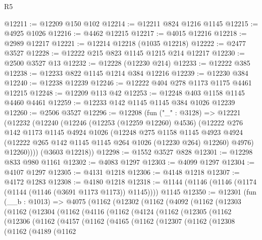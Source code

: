 \begin{lexlean}{R5}
\begin{coremodule}
@12211 := @12209 @150 @102
@12214 := @12211 @824 @1216 @1145
@12215 := @4925 @1026
@12216 := @4462 @12215
@12217 := @4015 @12216
@12218 := @2989 @12217
@12221 := @12214 @12218 (@1035 @12218)
@12222 := @2477 @3527
@12228 := @12222 @215 @823 @1145 @1215 @214 @12217
@12230 := @2500 @3527 @13
@12232 := @12228 (@12230 @214)
@12233 := @12222 @385
@12238 := @12233 @822 @1145 @1214 @384 @12216
@12239 := @12230 @384
@12240 := @12238 @12239
@12246 := @12222 @404 @278 @1173 @1175 @4461 @12215
@12248 := @12209 @113 @42
@12253 := @12248 @403 @1158 @1145 @4460 @4461
@12259 := @12233 @142 @1145 @1145 @384 @1026 @12239
@12260 := @2506 @3527
@12296 := @12208
    (fun ("_" : @3128) =>
    @12221
      (@12232
        (@12240
          (@12246
            (@12253 (@12259 @12260) @4536)
            (@12222
              @276
              @142
              @1173
              @1145
              @4924
              @1026
              (@12248
                @275
                @1158
                @1145
                @4923
                @4924
                (@12222 @265 @142 @1145 @1145 @264 @1026 (@12230 @264) @12260)
                @4976)
              @12260))))
      (@3603 @12218))
@12298 := @1552 @3527 @828
@12301 := @12298 @833 @980 @1161
@12302 := @4083 @1297
@12303 := @4099 @1297
@12304 := @4107 @1297
@12305 := @4131 @1218
@12306 := @4148 @1218
@12307 := @4172 @1283
@12308 := @4180 @1218
@12318 := @1144 (@1146 (@1146 (@1174 (@1144 (@1146 (@3691 @1173 @1173)) @1145)))) @1145
@12350 := @12301
    (fun (__b : @1013) =>
    @4075
      (@1162
        (@12302
          (@1162
            (@4092
              (@1162
                (@12303
                  (@1162
                    (@12304
                      (@1162
                        (@4116
                          (@1162
                            (@4124
                              (@1162
                                (@12305
                                  (@1162
                                    (@12306
                                      (@1162
                                        (@4157
                                          (@1162
                                            (@4165
                                              (@1162
                                                (@12307
                                                  (@1162
                                                    (@12308
                                                      (@1162
                                                        (@4189
                                                          (@1162

\end{coremodule}
\end{lexlean}

